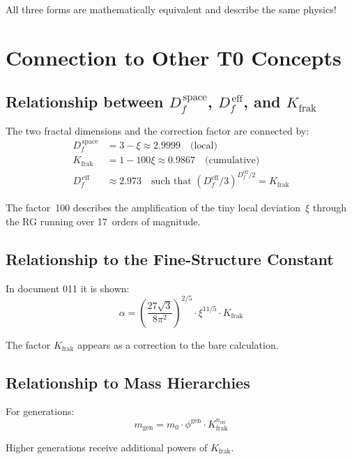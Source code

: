 	All three forms are mathematically equivalent and describe the same physics!
	
	\section{Connection to Other T0 Concepts}
	
	\subsection{Relationship between $D_f^{\,\text{space}}$, $D_f^{\,\text{eff}}$, and $K_{\text{frak}}$}
	
	The two fractal dimensions and the correction factor are connected by:
	\begin{align}
		D_f^{\,\text{space}} &= 3 - \xi \approx 2.9999 \quad \text{(local)} \\
		K_{\text{frak}} &= 1 - 100\xi \approx 0.9867 \quad \text{(cumulative)} \\
		D_f^{\,\text{eff}} &\approx 2.973 \quad \text{such that } (D_f^{\text{eff}}/3)^{D_f^{\text{eff}}/2} = K_{\text{frak}}
	\end{align}
	
	The factor~100 describes the amplification of the tiny local deviation~$\xi$ through the RG running over 17~orders of magnitude.
	
	\subsection{Relationship to the Fine-Structure Constant}
	
	In document 011 it is shown:
	\begin{equation}
		\alpha = \left(\frac{27\sqrt{3}}{8\pi^2}\right)^{2/5} \cdot \xi^{11/5} \cdot K_{\text{frak}}
	\end{equation}
	
	The factor $K_{\text{frak}}$ appears as a correction to the bare calculation.
	
	\subsection{Relationship to Mass Hierarchies}
	
	For generations:
	\begin{equation}
		m_{\text{gen}} = m_0 \cdot \phi^{\text{gen}} \cdot K_{\text{frak}}^{n_{\text{eff}}}
	\end{equation}
	
	Higher generations receive additional powers of $K_{\text{frak}}$.
	
